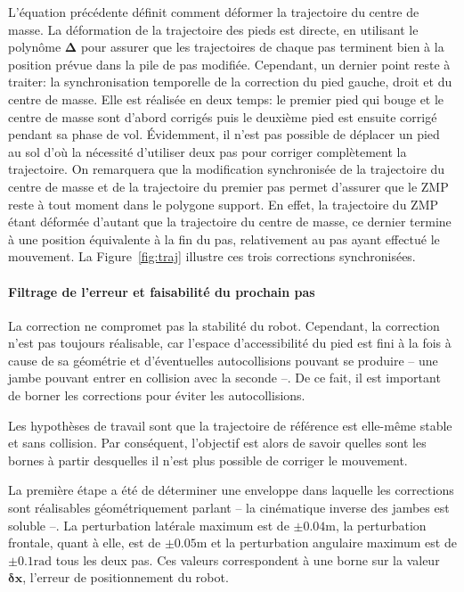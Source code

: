 L'équation précédente définit comment déformer la trajectoire du
centre de masse. La déformation de la trajectoire des pieds est
directe, en utilisant le polynôme $\mathbf{\Delta}$ pour assurer que
les trajectoires de chaque pas terminent bien à la position prévue
dans la pile de pas modifiée. Cependant, un dernier point reste à
traiter: la synchronisation temporelle de la correction du pied
gauche, droit et du centre de masse. Elle est réalisée en deux temps:
le premier pied qui bouge et le centre de masse sont d'abord corrigés
puis le deuxième pied est ensuite corrigé pendant sa phase de
vol. Évidemment, il n'est pas possible de déplacer un pied au sol d'où
la nécessité d'utiliser deux pas pour corriger complètement la
trajectoire. On remarquera que la modification synchronisée de la
trajectoire du centre de masse et de la trajectoire du premier pas
permet d'assurer que le ZMP reste à tout moment dans le polygone
support. En effet, la trajectoire du ZMP étant déformée d'autant que
la trajectoire du centre de masse, ce dernier termine à une position
équivalente à la fin du pas, relativement au pas ayant effectué le
mouvement. La Figure \ref{fig:traj} illustre ces trois corrections
synchronisées.


\paragraph{Filtrage de l'erreur et faisabilité du prochain pas}


La correction ne compromet pas la stabilité du robot. Cependant, la
correction n'est pas toujours réalisable, car l'espace d'accessibilité
du pied est fini à la fois à cause de sa géométrie et d'éventuelles
autocollisions pouvant se produire -- une jambe pouvant entrer en
collision avec la seconde --. De ce fait, il est important de borner
les corrections pour éviter les autocollisions.


Les hypothèses de travail sont que la trajectoire de référence est
elle-même stable et sans collision. Par conséquent, l'objectif est
alors de savoir quelles sont les bornes à partir desquelles il n'est
plus possible de corriger le mouvement.


La première étape a été de déterminer une enveloppe dans laquelle les
corrections sont réalisables géométriquement parlant -- la cinématique
inverse des jambes est soluble --. La perturbation latérale maximum
est de $\pm 0.04 \mathrm{m}$, la perturbation frontale, quant à elle,
est de $\pm 0.05 \mathrm{m}$ et la perturbation angulaire maximum est
de $\pm 0.1 \mathrm{rad}$ tous les deux pas. Ces valeurs correspondent
à une borne sur la valeur $\mathbf{\delta {x}}$, l'erreur de
positionnement du robot.


